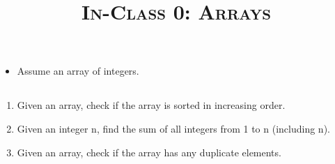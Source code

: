 \documentclass{article}
\title{\large{\textsc{In-Class 0: Arrays}}}
\date{}
\begin{document}
\maketitle

\begin{itemize}
    \item Assume an array of integers.
\end{itemize}

\subsection*{}

\begin{enumerate}

\item Given an array, check if the array is sorted in increasing order.

\item Given an integer n, find the sum of all integers from 1 to n (including n).

\item Given an array, check if the array has any duplicate elements.
    
    
\end{enumerate}
\end{document}
